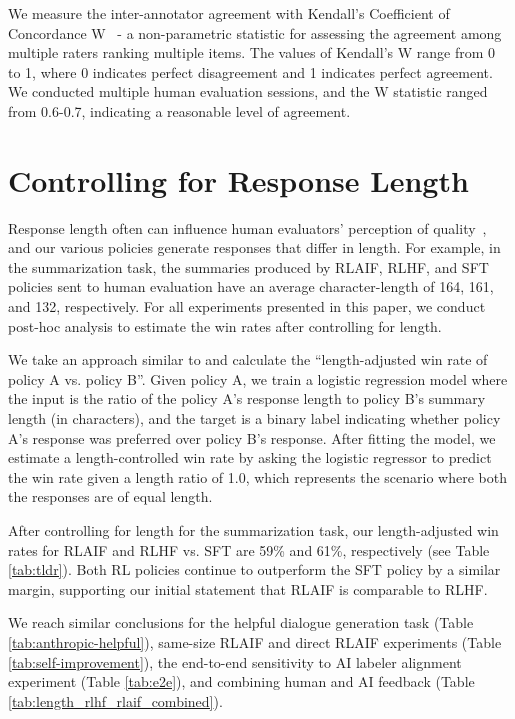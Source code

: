 \documentclass[11pt]{article}
\begin{document}
We measure the inter-annotator agreement with Kendall's Coefficient of Concordance W~\citep{kendalls-w} - a non-parametric statistic for assessing the agreement among multiple raters ranking multiple items. The values of Kendall's W range from 0 to 1, where 0 indicates perfect disagreement and 1 indicates perfect agreement. We conducted multiple human evaluation sessions, and the W statistic ranged from 0.6-0.7, indicating a reasonable level of agreement.

\section{Controlling for Response Length}
\label{sec:controlling_length}

Response length often can influence human evaluators' perception of quality~\citep{stiennon2020learning}, and our various policies generate responses that differ in length. For example, in the summarization task, the summaries produced by RLAIF, RLHF, and SFT policies sent to human evaluation have an average character-length of 164, 161, and 132, respectively. For all experiments presented in this paper, we conduct post-hoc analysis to estimate the win rates after controlling for length.

We take an approach similar to \citet{stiennon2020learning} and calculate the ``length-adjusted win rate of policy A vs. policy B''. Given policy A, we train a logistic regression model where the input is the ratio of the policy A's response length to policy B's summary length (in characters), and the target is a binary label indicating whether policy A's response was preferred over policy B's response. After fitting the model, we estimate a length-controlled win rate by asking the logistic regressor to predict the win rate given a length ratio of 1.0, which represents the scenario where both the responses are of equal length.

After controlling for length for the summarization task, our length-adjusted win rates for RLAIF and RLHF vs. SFT are 59\% and 61\%, respectively (see Table \ref{tab:tldr}). Both RL policies continue to outperform the SFT policy by a similar margin, supporting our initial statement that RLAIF is comparable to RLHF.

We reach similar conclusions for the helpful dialogue generation task (Table \ref{tab:anthropic-helpful}), same-size RLAIF and direct RLAIF experiments (Table \ref{tab:self-improvement}), the end-to-end sensitivity to AI labeler alignment experiment (Table \ref{tab:e2e}), and combining human and AI feedback (Table \ref{tab:length_rlhf_rlaif_combined}).
\end{document}
